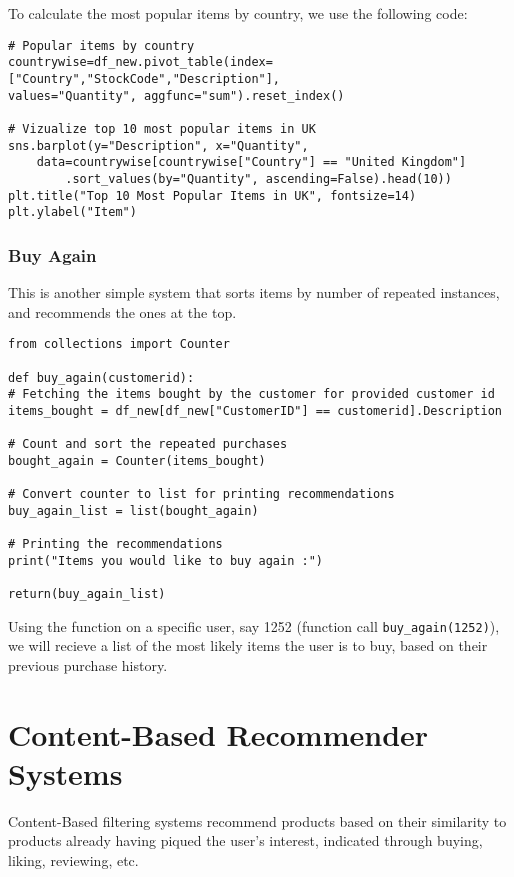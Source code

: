 \documentclass{article}
\begin{document}
\noindent To calculate the most popular items by country, we use the following code:

\begin{lstlisting}
# Popular items by country
countrywise=df_new.pivot_table(index=["Country","StockCode","Description"],
values="Quantity", aggfunc="sum").reset_index()

# Vizualize top 10 most popular items in UK
sns.barplot(y="Description", x="Quantity",
    data=countrywise[countrywise["Country"] == "United Kingdom"]
        .sort_values(by="Quantity", ascending=False).head(10))
plt.title("Top 10 Most Popular Items in UK", fontsize=14)
plt.ylabel("Item")
\end{lstlisting}

\subsubsection{Buy Again}

This is another simple system that sorts items by number of repeated instances, and recommends the ones at the top.

\begin{lstlisting}
from collections import Counter

def buy_again(customerid):
# Fetching the items bought by the customer for provided customer id
items_bought = df_new[df_new["CustomerID"] == customerid].Description

# Count and sort the repeated purchases
bought_again = Counter(items_bought)

# Convert counter to list for printing recommendations
buy_again_list = list(bought_again)

# Printing the recommendations
print("Items you would like to buy again :")

return(buy_again_list)
\end{lstlisting}

\noindent Using the function on a specific user, say 1252 (function call \texttt{buy\_again(1252)}), we will recieve a list of the most likely items the user is to buy, based on their previous purchase history.

\section{Content-Based Recommender Systems}

Content-Based filtering systems recommend products based on their similarity to products already having piqued the user's interest, indicated through buying, liking, reviewing, etc.
\end{document}
